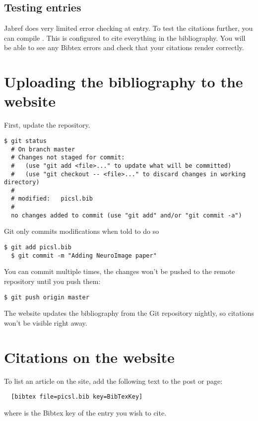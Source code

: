 \documentclass{InsightArticle}
\begin{document}
\subsection{Testing entries}

Jabref does very limited error checking at entry. To test the citations further, you can compile . This is configured to cite everything in the bibliography. You will be able to see any Bibtex errors and check that your citations render correctly.


\section{Uploading the bibliography to the website}

First, update the repository.

\begin{lstlisting}[style=bash]
  $ git status
  # On branch master
  # Changes not staged for commit:
  #   (use "git add <file>..." to update what will be committed)
  #   (use "git checkout -- <file>..." to discard changes in working directory)
  #
  #	modified:   picsl.bib
  #
  no changes added to commit (use "git add" and/or "git commit -a")
\end{lstlisting}

Git only commits modifications when told to do so
\begin{lstlisting}[style=bash]
  $ git add picsl.bib
  $ git commit -m "Adding NeuroImage paper" 
\end{lstlisting}

You can commit multiple times, the changes won't be pushed to the remote repository until you push them:
\begin{lstlisting}[style=bash]
  $ git push origin master 
\end{lstlisting}

The website updates the bibliography from the Git repository nightly, so citations won't be visible right away.


\section{Citations on the website}

To list an article on the site, add the following text to the post or page:
\begin{lstlisting}
  [bibtex file=picsl.bib key=BibTexKey]
\end{lstlisting}
where  is the Bibtex key of the entry you wish to cite. 
\end{document}
